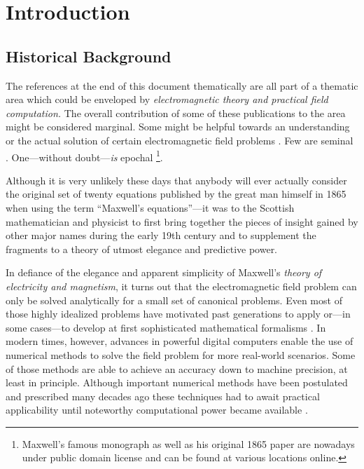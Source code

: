 \chapter{Introduction}
\label{ch:introduction}






\section{Historical Background}

The references at the end of this document thematically are all part of a
thematic area which could be enveloped by
\emph{electromagnetic theory and practical field computation.}
The overall contribution of some of these publications to the area might be
considered marginal.
Some might be helpful towards an understanding or the actual solution of certain 
electromagnetic field problems \cite{Michalski2016b}.
Few are seminal \cite{Sommerfeld1909}.
One---without doubt---\emph{is} epochal
\cite{maxwell1873}\footnote{Maxwell's famous monograph \cite{maxwell1873} as
well as his original 1865 paper are nowadays under public domain license
and can be found at various locations online.}.

Although it is very unlikely these days that anybody will ever actually consider
the original set of twenty equations published by the great man himself in 1865
\cite{maxwell1865} when using the term
\enquote{Maxwell's equations}---it was to the Scottish mathematician and
physicist to first bring together the pieces of insight gained by other major
names during the early 19th century and to supplement the fragments to a theory
of utmost elegance and predictive power.

In defiance of the elegance and apparent simplicity of Maxwell's \emph{theory
of electricity and magnetism}, it turns out that the electromagnetic field
problem can only be solved analytically for a small set of canonical problems.
Even most of those highly idealized problems have motivated past generations to
apply or---in some cases---to develop at first sophisticated mathematical
formalisms \cite{Sommerfeld1964,Felsen1994}.
In modern times, however, advances in powerful digital computers enable the use
of numerical methods to solve the field problem for more real-world scenarios.
Some of those methods are able to achieve an accuracy down to machine precision,
at least in principle.
Although important numerical methods have been postulated and prescribed many
decades ago these techniques had to await practical applicability until
noteworthy computational power became available \cite{Harrington1993}.

